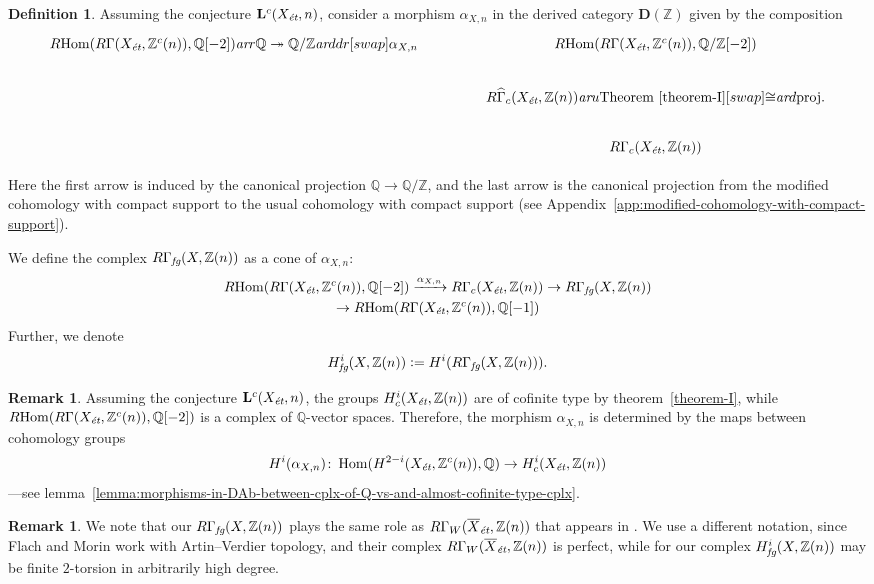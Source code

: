 \documentclass[draft,leqno,12pt]{article}
\theoremstyle{plain}
\theoremstyle{definition}
\newtheorem{definition}[theorem]{\indent\sc Definition}
\newtheorem{remark}[theorem]{\indent\sc Remark}
\DeclareMathOperator{\Hom}{Hom}
\newcommand{\ZZ}{\mathbb{Z}}
\newcommand{\QQ}{\mathbb{Q}}
\newcommand{\dfn}{\mathrel{\mathop:}=}
\newcommand{\et}{\text{\it \'{e}t}}
\newcommand{\fg}{\text{\it fg}}
\newcommand{\ar}{\text{\it ar}}
\newcommand{\RHom}{R\!\Hom}
\begin{document}
\begin{definition}
  \label{def:RGamma-fg}
  Assuming the conjecture $\mathbf{L}^c (X_\et,n)$, consider a morphism
  $\alpha_{X,n}$ in the derived category $\mathbf{D} (\ZZ)$ given by the
  composition
  \[ \begin{tikzcd}[column sep=4em]
    \RHom (R\Gamma (X_\et, \ZZ^c (n)), \QQ[-2]) \ar{r}{\QQ \twoheadrightarrow \QQ/\ZZ}\ar{ddr}[swap]{\alpha_{X,n}} & \RHom (R\Gamma (X_\et, \ZZ^c (n)), \QQ/\ZZ[-2]) \\
    & R\widehat{\Gamma}_c (X_\et, \ZZ (n)) \ar{u}{\text{Theorem \ref{theorem-I}}}[swap]{\cong} \ar{d}{\text{proj.}} \\
    & R\Gamma_c (X_\et, \ZZ (n))
  \end{tikzcd} \]

  Here the first arrow is induced by the canonical projection $\QQ \to \QQ/\ZZ$,
  and the last arrow is the canonical projection from the modified cohomology
  with compact support to the usual cohomology with compact support
  (see Appendix~\ref{app:modified-cohomology-with-compact-support}).

  We define the complex $R\Gamma_\fg (X, \ZZ(n))$ as a cone of $\alpha_{X,n}$:
  \begin{multline*}
    \RHom (R\Gamma (X_\et, \ZZ^c (n)), \QQ [-2]) \xrightarrow{\alpha_{X,n}}
    R\Gamma_c (X_\et, \ZZ (n)) \to
    R\Gamma_\fg (X, \ZZ(n)) \\
    \to \RHom (R\Gamma (X_\et, \ZZ^c (n)), \QQ [-1])
  \end{multline*}
  Further, we denote
  $$H^i_\fg (X, \ZZ (n)) \dfn H^i (R\Gamma_\fg (X, \ZZ (n))).$$
\end{definition}

\begin{remark}
  \label{rmk:alpha-X-n-determined-by-cohomology}
  Assuming the conjecture $\mathbf{L}^c (X_\et, n)$, the groups
  $H^i_c (X_\et, \ZZ (n))$ are of cofinite type by theorem~\ref{theorem-I},
  while $\RHom (R\Gamma (X_\et, \ZZ^c (n)), \QQ [-2])$ is a complex of
  $\QQ$-vector spaces. Therefore, the morphism $\alpha_{X,n}$ is determined by
  the maps between cohomology groups
  \[ H^i (\alpha_{X,n})\colon
    \Hom (H^{2-i} (X_\et, \ZZ^c (n)), \QQ) \to
    H^i_c (X_\et, \ZZ (n)) \]
  ---see lemma~\ref{lemma:morphisms-in-DAb-between-cplx-of-Q-vs-and-almost-cofinite-type-cplx}.
\end{remark}

\begin{remark}
  We note that our $R\Gamma_\fg (X, \ZZ (n))$ plays the same role as
  $R\Gamma_W (\overline{X}_\et, \ZZ (n))$ that appears in
  \cite[Definition~3.6]{Flach-Morin-2018}. We use a different notation, since
  Flach and Morin work with Artin--Verdier topology, and their complex
  $R\Gamma_W (\overline{X}_\et, \ZZ (n))$ is perfect, while for our complex
  $H^i_\fg (X, \ZZ (n))$ may be finite $2$-torsion in arbitrarily high degree.
\end{remark}
\end{document}
